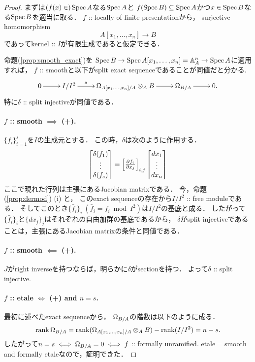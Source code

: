 \documentclass[a4paper, dvipdfmx]{jsarticle}
\begin{document}
\begin{proof}
    まずは$(f(x) \in) \operatorname{Spec} A$なる$\operatorname{Spec} A$と
    $f(\operatorname{Spec} B) \subseteq \operatorname{Spec} A$かつ$x \in \operatorname{Spec} B$なる$\operatorname{Spec} B$を適当に取る．
    $f$ :: locally of finite presentationから，
    surjective homomorphism
    \[ A[x_1, \dots, x_n] \to B \]
    であってkernel :: $I$が有限生成であると仮定できる．

    命題(\ref{prop:smooth_exact})を
    $\operatorname{Spec} B \to \operatorname{Spec} A[x_1,\dots,x_n]=\mathbb{A}^n_A \to \operatorname{Spec} A$に適用すれば，
    $f$ :: smoothと以下がsplit exact sequenceであることが同値だと分かる.
    \[\xymatrix{
        0 \ar[r]& I/I^2 \ar[r]^-{\delta}& \modDer_{A[x_1,\dots,x_n]/A} \otimes_A B \ar[r]& \modDer_{B/A} \ar[r]& 0.
    }\]
    特に$\delta$ :: split injectiveが同値である．

    \paragraph{$f$ :: smooth $\implies$ (+).}
    $\{ f_i \}_{i=1}^s$を$I$の生成元とする．
    この時，$\delta$は次のように作用する．
    \[ \begin{bmatrix}\delta(\bar{f}_1) \\ \vdots \\ \delta(f_s)\end{bmatrix}
    =\begin{bmatrix}\frac{\partial f_i}{\partial x_j}\end{bmatrix}_{i,j} \begin{bmatrix}dx_1 \\ \vdots \\ dx_n\end{bmatrix} \]
    ここで現れた行列は主張にあるJacobian matrixである．
    今，命題(\ref{prop:dermod}) (i) と，
    このexact sequenceの存在から$I/I^2$ :: free moduleである．
    そしてこのとき$\{ \bar{f}_i \}_i \ (\bar{f}_i=f_i \bmod I^2)$は$I/I^2$の基底と成る．
    したがって$\{\bar{f}_i\}_i$と$\{dx_j\}_j$はそれぞれの自由加群の基底であるから，
    $\delta$がsplit injectiveであることは，主張にあるJacobian matrixの条件と同値である．

    \paragraph{$f$ :: smooth $\impliedby$ (+).}
    $J$がright inverseを持つならば，明らかに$\delta$がsectionを持つ．
    よって$\delta$ :: split injective.
    
    \paragraph{$f$ :: etale $\iff$ (+) and $n=s$.}
    最初に述べたexact sequenceから，
    $\Omega_{B/A}$の階数は以下のように成る．
    \[
        \operatorname{rank} \Omega_{B/A}
        =\operatorname{rank} (\Omega_{A[x_1,\dots,x_n]/A} \otimes_A B)-\operatorname{rank} (I/I^2)
        =n-s.
    \]
    したがって$n=s \iff \Omega_{B/A}=0 \iff f$ :: formally unramified.
    etale$=$smooth and formally etaleなので，証明できた．
\end{proof}
\end{document}
